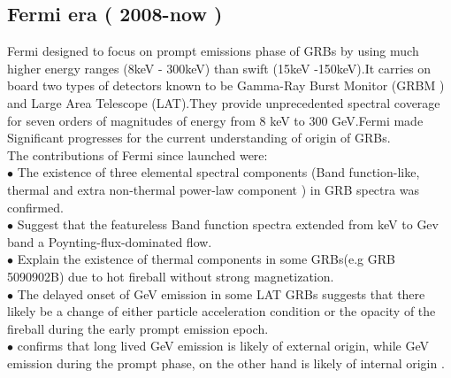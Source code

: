\subsection{Fermi era ( 2008-now )}
 Fermi designed to focus on prompt emissions phase of GRBs by using  much higher energy ranges (8keV - 300keV) than swift (15keV -150keV).It carries on board two types of detectors known to be  Gamma-Ray Burst Monitor (GRBM ) and Large Area Telescope (LAT).They provide unprecedented spectral coverage for seven orders of magnitudes of energy from 8 keV to 300 GeV.Fermi made Significant progresses for the current understanding of origin of GRBs.\\ 	The contributions of Fermi since launched were:\\
$\bullet$ The existence of three elemental spectral components (Band function-like, thermal and extra non-thermal power-law component ) in GRB spectra was confirmed.\\
$\bullet$ Suggest that the featureless Band function spectra extended from keV to Gev band a Poynting-flux-dominated flow.\\
$\bullet$ Explain the existence of thermal components in some GRBs(e.g GRB 5090902B) due to hot fireball without strong magnetization.\\
$\bullet$ The delayed onset of GeV emission in some LAT GRBs suggests that there likely be a change of either particle acceleration condition or the opacity of the fireball during the early prompt emission epoch.\\
$\bullet$ confirms that long lived GeV emission is likely of external origin, while GeV emission during the prompt phase, on the other hand is likely of internal origin \citep{10} \citep{11}.
